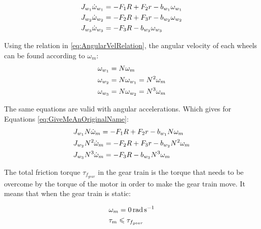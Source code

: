 \begin{subequations} 
	\begin{flalign} \label{eq:GiveMeAnOriginalName}
		&J_{w_1}\dot{\omega}_{w_1} = -F_1R + F_2r -b_{w_1}\omega_{w_1} \addunit{\newton\meter}\\ 
		&J_{w_2}\dot{\omega}_{w_2} = -F_2R + F_3r -b_{w_2}\omega_{w_2} \addunit{\newton\meter}\\ 
		&J_{w_3}\dot{\omega}_{w_3} = -F_3R - b_{w_3}\omega_{w_3} \addunit{\newton\meter}
	\end{flalign}
\end{subequations}

Using the relation in \autoref{eq:AngularVelRelation}, the angular velocity of each wheels can be found according to $\omega_m$:
\begin{subequations} 
	\begin{flalign}
		&\omega_{w_1} = N \omega_m \addunit{\radian\per\second}\\
		&\omega_{w_2} = N \omega_{w_1} = N^2 \omega_m \addunit{\radian\per\second}\\
		&\omega_{w_3} = N \omega_{w_2} = N^3 \omega_m \addunit{\radian\per\second}
	\end{flalign}
\end{subequations}

The same equations are valid with angular accelerations.
Which gives for Equations \ref{eq:GiveMeAnOriginalName}:
\begin{subequations} 
	\begin{flalign}  
		&J_{w_1}N\dot{\omega}_m = -F_1R + F_2r -b_{w_1}N\omega_m \addunit{\newton\meter}\\ 
		&J_{w_2}N^2\dot{\omega}_m = -F_2R + F_3r -b_{w_2}N^2\omega_m  \addunit{\newton\meter}\\ 
		&J_{w_3}N^3\dot{\omega}_m = -F_3R - b_{w_3}N^3\omega_m  \addunit{\newton\meter}
	\end{flalign}
\end{subequations}

The total friction torque $\tau_{f_{gear}}$ in the gear train is the torque that needs to be overcome by the torque of the motor in order to make the gear train move. It means that when the gear train is static:

\begin{subequations} \label{eq:findTauf}
	\begin{flalign}
		&\omega_m = \SI{0}{\radian\per\second}\\
		&\tau_m \leqslant \tau_{f_{gear}} \addunit{\newton\meter}
	\end{flalign}
\end{subequations}

